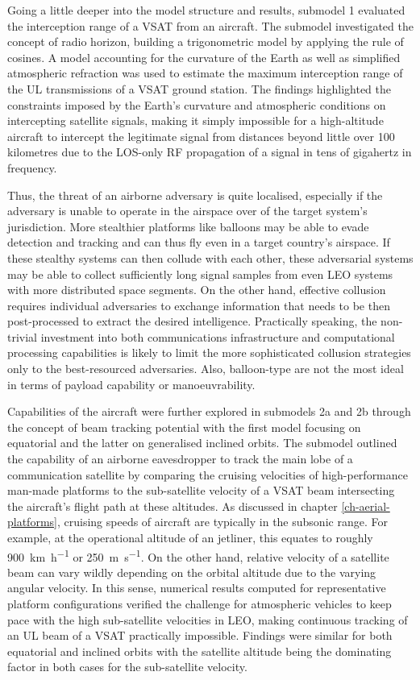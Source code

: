 \documentclass[english, 12pt, a4paper, elec, utf8, a-1b, online]{aaltothesis}
\begin{document}
Going a little deeper into the model structure and results, submodel 1 evaluated the interception range of a VSAT from an aircraft.
The submodel investigated the concept of radio horizon, building a trigonometric model by applying the rule of cosines.
A model accounting for the curvature of the Earth as well as simplified atmospheric refraction was used to estimate the maximum interception range of the UL transmissions of a VSAT ground station.
The findings highlighted the constraints imposed by the Earth's curvature and atmospheric conditions on intercepting satellite signals, making it simply impossible for a high-altitude aircraft to intercept the legitimate signal from distances beyond little over 100 kilometres due to the LOS-only RF propagation of a signal in tens of gigahertz in frequency.

Thus, the threat of an airborne adversary is quite localised, especially if the adversary is unable to operate in the airspace over of the target system's jurisdiction.
More stealthier platforms like balloons may be able to evade detection and tracking and can thus fly even in a target country's airspace.
If these stealthy systems can then collude with each other, these adversarial systems may be able to collect sufficiently long signal samples from even LEO systems with more distributed space segments.
On the other hand, effective collusion requires individual adversaries to exchange information that needs to be then post-processed to extract the desired intelligence.
Practically speaking, the non-trivial investment into both communications infrastructure and computational processing capabilities is likely to limit the more sophisticated collusion strategies only to the best-resourced adversaries.
Also, balloon-type are not the most ideal in terms of payload capability or manoeuvrability.

Capabilities of the aircraft were further explored in submodels 2a and 2b through the concept of beam tracking potential with the first model focusing on equatorial and the latter on generalised inclined orbits. The submodel outlined the capability of an airborne eavesdropper to track the main lobe of a communication satellite by comparing the cruising velocities of high-performance man-made platforms to the sub-satellite velocity of a VSAT beam intersecting the aircraft's flight path at these altitudes.
As discussed in chapter \ref{ch-aerial-platforms}, cruising speeds of aircraft are typically in the subsonic range.
For example, at the operational altitude of an jetliner, this equates to roughly \SI[per-mode=repeated-symbol]{900}{\kilo\meter\per\hour} or \SI[per-mode=repeated-symbol]{250}{\meter\per\second}.
On the other hand, relative velocity of a satellite beam can vary wildly depending on the orbital altitude due to the varying angular velocity.
In this sense, numerical results computed for representative platform configurations verified the challenge for atmospheric vehicles to keep pace with the high sub-satellite velocities in LEO, making continuous tracking of an UL beam of a VSAT practically impossible. Findings were similar for both equatorial and inclined orbits with the satellite altitude being the dominating factor in both cases for the sub-satellite velocity.
\end{document}
